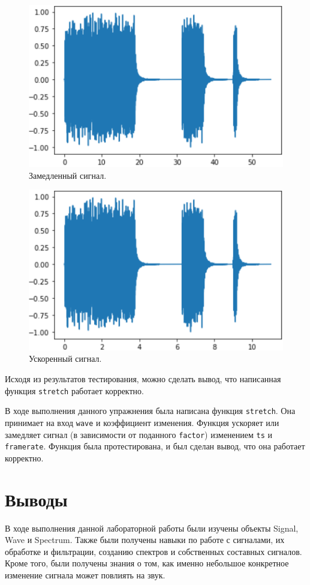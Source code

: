 \documentclass[a4paper, 14pt]{extarticle}
\begin{document}
    \begin{figure}[H]
        \centering
        \includegraphics[width=0.7\linewidth]{task4_signal_deceleration}
        \caption{Замедленный сигнал.}
        \label{fig:task4_signal_deceleration}
    \end{figure}

    \begin{figure}[H]
        \centering
        \includegraphics[width=0.7\linewidth]{task4_signal_acceleration}
        \caption{Ускоренный сигнал.}
        \label{fig:task4_signal_acceleration}
    \end{figure}

    Исходя из результатов тестирования, можно сделать вывод, что написанная функция \texttt{stretch} работает корректно.

    В ходе выполнения данного упражнения была написана функция \texttt{stretch}.
    Она принимает на вход \texttt{wave} и коэффициент изменения.
    Функция ускоряет или замедляет сигнал (в зависимости от поданного \texttt{factor}) изменением \texttt{ts} и \texttt{framerate}.
    Функция была протестирована, и был сделан вывод, что она работает корректно.

    \newpage

    \section{Выводы}
    \label{sec:conclusions}

    В ходе выполнения данной лабораторной работы были изучены объекты Signal, Wave и Spectrum.
    Также были получены навыки по работе с сигналами, их обработке и фильтрации, созданию спектров и собственных составных сигналов.
    Кроме того, были получены знания о том, как именно небольшое конкретное изменение сигнала может повлиять на звук.
\end{document}
